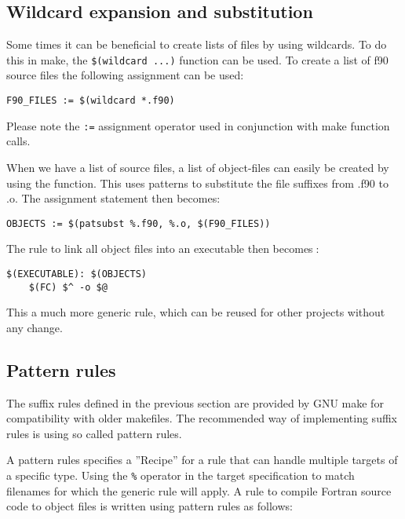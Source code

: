 \subsection{Wildcard expansion and substitution}

Some times it can be beneficial to create lists of files by using wildcards. To do this in make, the \verb+$(wildcard ...)+ function can be used. To create a list of f90 source files the following assignment can be used:

\mmode

\begin{lstlisting}
F90_FILES := $(wildcard *.f90)
\end{lstlisting}

Please note the \verb+:=+ assignment operator used in conjunction with make function calls. 

When we have a list of source files, a list of object-files can easily be created by using the  function. This uses patterns to substitute the file suffixes from .f90 to .o. The assignment statement then becomes:

\begin{lstlisting}
OBJECTS := $(patsubst %.f90, %.o, $(F90_FILES))
\end{lstlisting}

The rule to link all object files into an executable then becomes:

\begin{lstlisting}
$(EXECUTABLE): $(OBJECTS)
	$(FC) $^ -o $@
\end{lstlisting}

This a much more generic rule, which can be reused for other projects without any change.

\subsection{Pattern rules}

The suffix rules defined in the previous section are provided by GNU make for compatibility with older makefiles. The recommended way of implementing suffix rules is using so called pattern rules.

A pattern rules specifies a ''Recipe'' for a rule that can handle multiple targets of a specific type. Using the \verb+%+ operator in the target specification to match filenames for which the generic rule will apply. A rule to compile Fortran source code to object files is written using pattern rules as follows:

